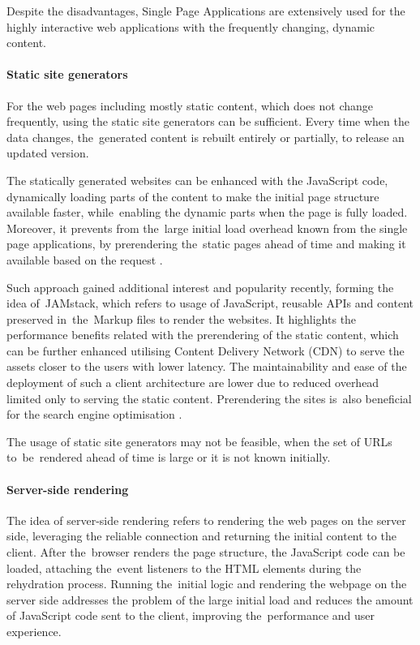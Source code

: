 Despite the disadvantages, Single Page Applications are extensively used for the highly interactive web applications with the frequently changing, dynamic content.

\paragraph{Static site generators} \label{chapter:client-application-tier-static-site-generators}

For the web pages including mostly static content, which does not change frequently, using the static site generators can be sufficient. Every time when the data changes, the~generated content is rebuilt entirely or partially, to release an updated version.

The statically generated websites can be enhanced with the JavaScript code, dynamically loading parts of the content to make the initial page structure available faster, while~enabling the dynamic parts when the page is fully loaded. Moreover, it prevents from the~large initial load overhead known from the single page applications, by prerendering the~static pages ahead of time and making it available based on the request \cite{GoogleRenderingOnTheWeb}.

Such approach gained additional interest and popularity recently, forming the idea of~JAMstack, which refers to usage of JavaScript, reusable APIs and content preserved in~the~Markup files to render the websites. It highlights the performance benefits related with the prerendering of the static content, which can be further enhanced utilising Content Delivery Network (CDN) to serve the assets closer to the users with lower latency. The maintainability and ease of the deployment of such a client architecture are lower due to reduced overhead limited only to serving the static content. Prerendering the sites is~also beneficial for the search engine optimisation \cite{JAMstack}.

The usage of static site generators may not be feasible, when the set of URLs to~be~rendered ahead of time is large or it is not known initially.

\paragraph{Server-side rendering} \label{chapter:client-application-tier-server-side-rendering}

The idea of server-side rendering refers to rendering the web pages on the server side, leveraging the reliable connection and returning the initial content to the client. After the~browser renders the page structure, the JavaScript code can be loaded, attaching the~event listeners to the HTML elements during the rehydration process. Running the~initial logic and rendering the webpage on the server side addresses the problem of the large initial load and reduces the amount of JavaScript code sent to the client, improving the~performance and user experience.

